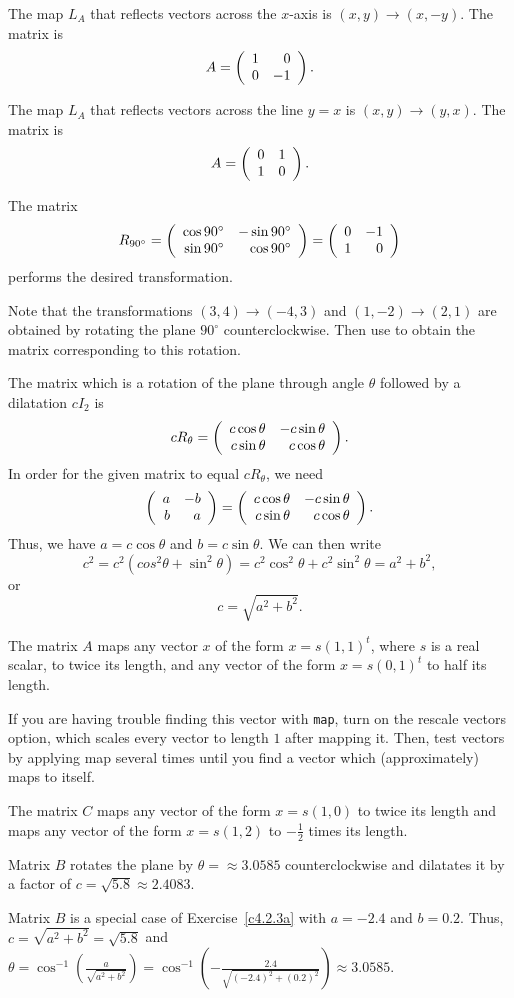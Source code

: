 \documentclass{ximera}
\begin{document}
 The map $L_A$ that reflects vectors across the $x$-axis is
$(x,y) \rightarrow (x,-y)$.  The matrix is
\[
A = \left(\begin{array}{rr} 1 & 0\\ 0 &-1\end{array}\right).
\]

 The map $L_A$ that reflects vectors across the line $y=x$ is
$(x,y) \rightarrow (y,x)$.  The matrix is
\[
A = \left(\begin{array}{rr} 0 & 1\\ 1 &0\end{array}\right).
\]

\ans The matrix
\[ R_{90^\circ} = \left(\begin{array}{rr} \cos{90^\circ} & -\sin{90^\circ}\\ \sin{90^\circ} &\cos{90^\circ}\end{array}\right) = \left(\begin{array}{rr} 0 & -1\\ 1 &0\end{array}\right) \]
performs the desired transformation.

\soln Note that the transformations $(3,4) \rightarrow (-4,3)$ and
$(1,-2) \rightarrow (2,1)$ are obtained by rotating the plane
$90^\circ$ counterclockwise.  Then use  to obtain the
matrix corresponding to this rotation.

 The matrix which is a rotation of the plane 
through angle $\theta$ followed by a dilatation $cI_2$ is
\[
cR_\theta =
\left(\begin{array}{rr} c\cos\theta & -c\sin\theta\\ c\sin\theta &c\cos\theta\end{array}\right).
\]
In order for the given matrix to equal $cR_\theta$, we need
\[
\left(\begin{array}{rr} a & -b\\ b &a\end{array}\right) =
\left(\begin{array}{rr} c\cos\theta & -c\sin\theta\\ c\sin\theta &c\cos\theta\end{array}\right).
\]
Thus, we have $a = c\cos\theta$ and $b = c\sin\theta$.  We can then write
\[
c^2 = c^2(cos^2\theta + \sin^2\theta) = c^2\cos^2\theta + c^2\sin^2\theta
= a^2 + b^2,
\]
or
\[
c = \sqrt{a^2 + b^2}.
\]

 The matrix $A$ maps any vector $x$ of the form
$x = s(1,1)^t$, where $s$ is a real scalar, to twice its length, and any
vector of the form $x = s(0,1)^t$ to half its length.

\para If you are having trouble finding this vector with {\tt map},
turn on the rescale vectors option, which scales every vector to length
$1$ after mapping it.  Then, test vectors by applying {\sf map} several
times until you find a vector which (approximately) maps to itself.

\newpage
{} The matrix $C$ maps any vector of the form $x = s(1,0)$
to twice its length and maps any vector of the form $x = s(1,2)$ to
$-\frac{1}{2}$ times its length.

 \ans Matrix $B$ rotates the plane by $\theta =
\approx 3.0585$ counterclockwise and dilatates it by a factor of
$c = \sqrt{5.8} \approx 2.4083$.

\soln Matrix $B$ is a special case of Exercise~\ref{c4.2.3a} with $a = -2.4$
and $b = 0.2$.  Thus, $c = \sqrt{a^2 + b^2} = \sqrt{5.8}$ and
$\theta = \cos^{-1}\left(\frac{a}{\sqrt{a^2 + b^2}}\right) =
\cos^{-1}\left(-\frac{2.4}{\sqrt{(-2.4)^2 + (0.2)^2}}\right) \approx 3.0585$.
\end{document}
